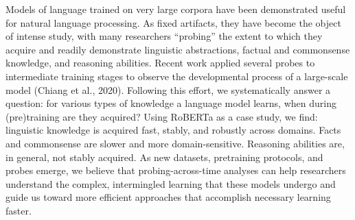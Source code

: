 Models of language trained on very large corpora have been demonstrated useful for natural language processing. As fixed artifacts, they have become the object of intense study, with many researchers ``probing'' the extent to which they acquire and readily demonstrate linguistic abstractions, factual and commonsense knowledge, and reasoning abilities. Recent work applied several probes to intermediate training stages to observe the developmental process of a large-scale model (Chiang et al., 2020). Following this effort, we systematically answer a question: for various types of knowledge a language model learns, when during (pre)training are they acquired? Using RoBERTa as a case study, we find:  linguistic knowledge is acquired fast, stably, and robustly across domains. Facts and commonsense are slower and more domain-sensitive. Reasoning abilities are, in general, not stably acquired. As new datasets, pretraining protocols, and probes emerge, we believe that probing-across-time analyses can help researchers understand the complex, intermingled learning that these models undergo and guide us toward more efficient approaches that accomplish necessary learning faster.
